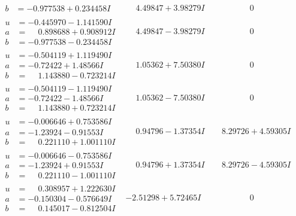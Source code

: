 \documentclass[1p]{elsarticle_modified}
\theoremstyle{definition}
\begin{document}
$$\begin{array}{c|c|c}
\begin{aligned}
b &= -0.977538 + 0.234458 I\end{aligned}
 & \phantom{-}4.49847 + 3.98279 I & \phantom{-0.000000 } 0 \\ \hline\begin{aligned}
u &= -0.445970 - 1.141590 I \\
a &= \phantom{-}0.898688 + 0.908912 I \\
b &= -0.977538 - 0.234458 I\end{aligned}
 & \phantom{-}4.49847 - 3.98279 I & \phantom{-0.000000 } 0 \\ \hline\begin{aligned}
u &= -0.504119 + 1.119490 I \\
a &= -0.72422 + 1.48566 I \\
b &= \phantom{-}1.143880 - 0.723214 I\end{aligned}
 & \phantom{-}1.05362 + 7.50380 I & \phantom{-0.000000 } 0 \\ \hline\begin{aligned}
u &= -0.504119 - 1.119490 I \\
a &= -0.72422 - 1.48566 I \\
b &= \phantom{-}1.143880 + 0.723214 I\end{aligned}
 & \phantom{-}1.05362 - 7.50380 I & \phantom{-0.000000 } 0 \\ \hline\begin{aligned}
u &= -0.006646 + 0.753586 I \\
a &= -1.23924 - 0.91553 I \\
b &= \phantom{-}0.221110 + 1.001110 I\end{aligned}
 & \phantom{-}0.94796 - 1.37354 I & \phantom{-}8.29726 + 4.59305 I \\ \hline\begin{aligned}
u &= -0.006646 - 0.753586 I \\
a &= -1.23924 + 0.91553 I \\
b &= \phantom{-}0.221110 - 1.001110 I\end{aligned}
 & \phantom{-}0.94796 + 1.37354 I & \phantom{-}8.29726 - 4.59305 I \\ \hline\begin{aligned}
u &= \phantom{-}0.308957 + 1.222630 I \\
a &= -0.150304 - 0.576649 I \\
b &= \phantom{-}0.145017 - 0.812504 I\end{aligned}
 & -2.51298 + 5.72465 I & \phantom{-0.000000 } 0 \\ \hline\begin{aligned}

\end{aligned}
\end{array}$$
\end{document}
